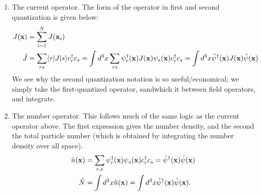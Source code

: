 \begin{enumerate}
    \item The current operator. The form of the operator in first and second quantization is given below:
    \begin{equation}
        \begin{split}
            J(\mathbf{x}) &= \sum_{i=1}^N J(\mathbf{x}_i)
            \\ \hat{J} &= \sum_{rs}\langle r \rvert J\lvert s \rangle c_r^\dagger c_s = \int d^3x \sum_{rs} \psi_r^\dagger(\mathbf{x}) J(\mathbf{x})\psi_s(\mathbf{x})c_r^\dagger c_s = \int d^3 x \hat{\psi}^\dagger(\mathbf{x})J(\mathbf{x})\hat{\psi}(\mathbf{x})
        \end{split}
    \end{equation}
    We see why the second quantization notation is so useful/economical; we simply take the first-quantized operator, sandwhich it between field operators, and integrate.
    \item The number operator. This follows much of the same logic as the current operator above. The first expression gives the number density, and the second the total particle number (which is obtained by integrating the number density over all space).
    \begin{equation}
        \begin{split}
            \hat{n}(\mathbf{x}) &= \sum_{r, s} \psi_r^\dagger(\mathbf{x})\psi_s(\mathbf{x})c_r^\dagger c_s = \hat{\psi}^\dagger(\mathbf{x})\hat{\psi}(\mathbf{x})
            \\ \hat{N} &= \int d^3x \hat{n}(\mathbf{x}) = \int d^3x\hat{\psi}^\dagger(\mathbf{x})\hat{\psi}(\mathbf{x}).
        \end{split}
    \end{equation}
\end{enumerate}